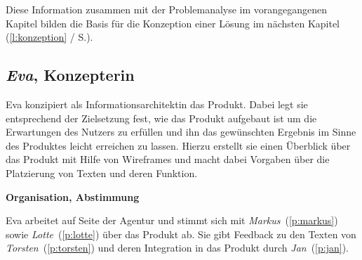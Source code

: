 \bigskip

Diese Information zusammen mit der Problemanalyse im vorangegangenen Kapitel bilden die Basis für die Konzeption einer Lösung im nächsten Kapitel (\ref{l:konzeption} / S.\pageref{l:konzeption}).

\pagebreak

\subsection{\emph{Eva}, Konzepterin}\label{p:eva}

\begin{multicols}{2}

\begin{center}
\end{center}


Eva konzipiert als Informationsarchitektin das Produkt. Dabei legt sie entsprechend der Zielsetzung fest, wie das Produkt aufgebaut ist um die Erwartungen des Nutzers zu erfüllen und ihn das gewünschten Ergebnis im Sinne des Produktes leicht erreichen zu lassen. Hierzu erstellt sie einen Überblick über das Produkt mit Hilfe von Wireframes und macht dabei Vorgaben über die Platzierung von Texten und deren Funktion.

\textbf{Organisation, Abstimmung}

Eva arbeitet auf Seite der Agentur und stimmt sich mit \emph{Markus}~(\ref{p:markus}) sowie \emph{Lotte}~(\ref{p:lotte}) über das Produkt ab. Sie gibt Feedback zu den Texten von \emph{Torsten}~(\ref{p:torsten}) und deren Integration in das Produkt durch \emph{Jan}~(\ref{p:jan}).


\end{multicols}
